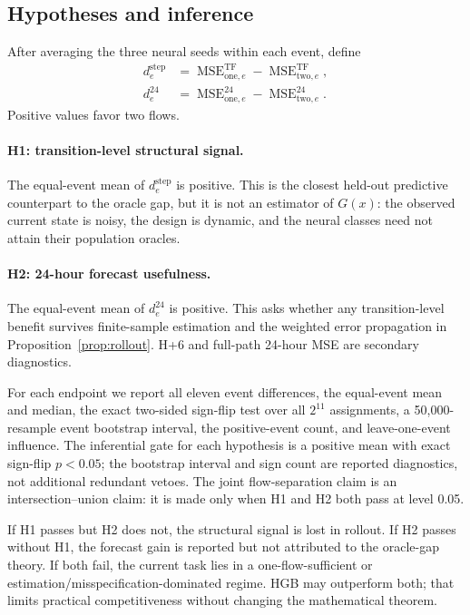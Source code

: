 \documentclass[twoside]{article}
\theoremstyle{plain}
\theoremstyle{definition}
\theoremstyle{remark}
\begin{document}
\subsection{Hypotheses and inference}

After averaging the three neural seeds within each event, define
\begin{align}
d_e^{\mathrm{step}}
&=\operatorname{MSE}^{\mathrm{TF}}_{\mathrm{one},e}
 -\operatorname{MSE}^{\mathrm{TF}}_{\mathrm{two},e},\nonumber\\
d_e^{24}
&=\operatorname{MSE}^{24}_{\mathrm{one},e}
 -\operatorname{MSE}^{24}_{\mathrm{two},e}.
\label{eq:contrasts}
\end{align}
Positive values favor two flows.

\paragraph{H1: transition-level structural signal.}
The equal-event mean of \(d_e^{\mathrm{step}}\) is positive. This is the
closest held-out predictive counterpart to the oracle gap, but it is not an
estimator of \(G(x)\): the observed current state is noisy, the design is
dynamic, and the neural classes need not attain their population oracles.

\paragraph{H2: 24-hour forecast usefulness.}
The equal-event mean of \(d_e^{24}\) is positive. This asks whether any
transition-level benefit survives finite-sample estimation and the weighted
error propagation in Proposition~\ref{prop:rollout}. H+6 and full-path 24-hour
MSE are secondary diagnostics.

For each endpoint we report all eleven event differences, the equal-event mean
and median, the exact two-sided sign-flip test over all \(2^{11}\) assignments,
a 50,000-resample event bootstrap interval, the positive-event count, and
leave-one-event influence. The inferential gate for each hypothesis is a
positive mean with exact sign-flip \(p<0.05\); the bootstrap interval and sign
count are reported diagnostics, not additional redundant vetoes. The joint
flow-separation claim is an intersection--union claim: it is made only when H1
and H2 both pass at level 0.05.

If H1 passes but H2 does not, the structural signal is lost in rollout. If H2
passes without H1, the forecast gain is reported but not attributed to the
oracle-gap theory. If both fail, the current task lies in a one-flow-sufficient
or estimation/misspecification-dominated regime. HGB may outperform both; that
limits practical competitiveness without changing the mathematical theorem.
\end{document}
